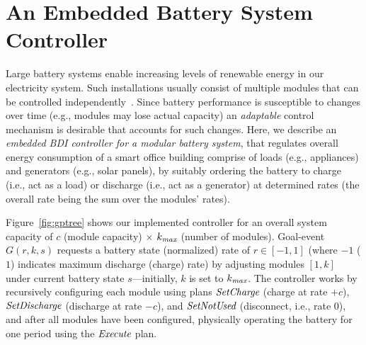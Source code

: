 \section{An Embedded Battery System Controller}\label{sec:application}

\newcommand{\mmax}{\mathname{max}}

Large battery systems enable increasing levels of renewable energy in our electricity system. 
%
Such installations usually consist of multiple modules that can be controlled independently~\cite{norris02:grid}. 
Since battery performance is susceptible to changes over time (e.g., modules may lose actual capacity) an \emph{adaptable} control mechanism is desirable that accounts for such changes.
%
Here, we describe an {\em embedded BDI controller for a modular battery system}, that regulates overall energy consumption of a smart office building comprise of loads (e.g., appliances) and generators (e.g., solar panels), by suitably ordering the battery to charge (i.e., act as a load) or discharge (i.e., act as a generator) at determined rates (the overall rate being the sum over the modules' rates).

Figure~\ref{fig:gptree} shows our implemented controller for an overall system capacity of $c$ (module capacity) $\times$ $k_{\mmax}$ (number of modules). Goal-event $G(r,k,s)$ requests a battery state (normalized) rate of $r \in [-1,1]$ (where $-1$ ($1$) indicates maximum discharge (charge) rate) by adjusting modules $[1,k]$ under current battery state $s$---initially, $k$ is set to $k_{\mmax}$. 
The controller works by recursively configuring each module using plans $\operatorname{\textit{SetCharge}}$ (charge at rate $+c$), $\operatorname{\textit{SetDischarge}}$ (discharge at rate $-c$), and $\operatorname{\textit{SetNotUsed}}$ (disconnect, i.e., rate $0$), and after all modules have been configured, physically operating the battery for one period using the $\operatorname{\textit{Execute}}$ plan. 

